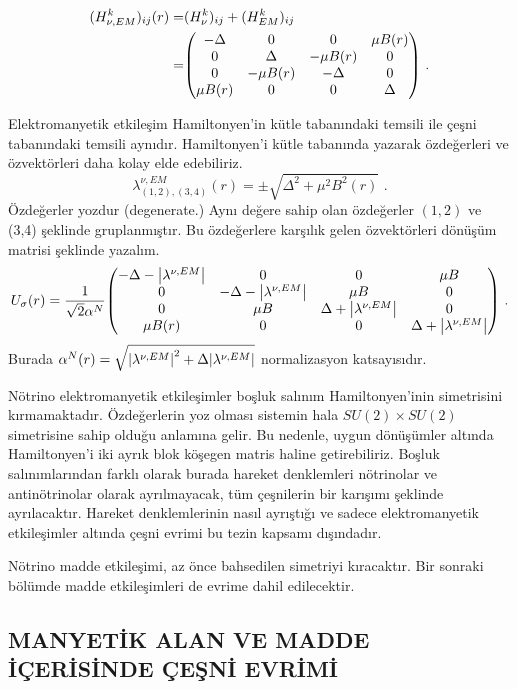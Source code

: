 \begin{align}
	\nonumber (H^{k}_{\nu,EM})_{ij}(r) =& (H^{k}_{\nu})_{ij} + (H^{k}_{EM})_{ij} \\
	=& \mqty(-\Delta&0&0&\mu B(r)\\0&\Delta&-\mu B(r)&0\\0&-\mu B(r)&-\Delta&0\\\mu B(r)&0&0&\Delta) \text{ .}
\end{align}

Elektromanyetik etkileşim Hamiltonyen'in kütle tabanındaki temsili ile çeşni tabanındaki temsili aynıdır. Hamiltonyen'i kütle tabanında yazarak özdeğerleri ve özvektörleri daha kolay elde edebiliriz.
\begin{equation} \label{eqn:eigValNuEm}
	\lambda^{\nu,EM}_{(1,2),(3,4)}(r) = \pm \sqrt{\Delta^{2} + \mu^{2} B^{2}(r)} \text{ .}
\end{equation}
Özdeğerler yozdur (degenerate.) Aynı değere sahip olan özdeğerler $ (1,2) $ ve (3,4) şeklinde gruplanmıştır. Bu özdeğerlere karşılık gelen özvektörleri dönüşüm matrisi şeklinde yazalım.
\begin{equation}
	U_{\sigma}(r) = \frac{1}{\sqrt{2}\alpha^{N}}\mqty(-\Delta-\abs{\lambda^{\nu,EM}} & 0 & 0 & \mu B\\0 &-\Delta-\abs{\lambda^{\nu,EM}} & \mu B & 0\\0 & \mu B & \Delta+\abs{\lambda^{\nu,EM}} & 0\\\mu B(r) & 0 & 0 & \Delta+\abs{\lambda^{\nu,EM}}) \text{ .}
\end{equation}
Burada $ \alpha^{N}(r) = \sqrt{\abs{\lambda^{\nu,EM}}^{2} + \Delta \abs{\lambda^{\nu,EM}}} $ normalizasyon katsayısıdır. 

Nötrino elektromanyetik etkileşimler boşluk salınım Hamiltonyen'inin simetrisini kırmamaktadır. Özdeğerlerin yoz olması sistemin hala $ SU(2) \times SU(2) $ simetrisine sahip olduğu anlamına gelir. Bu nedenle, uygun dönüşümler altında Hamiltonyen'i iki ayrık blok köşegen matris haline getirebiliriz. Boşluk salınımlarından farklı olarak burada hareket denklemleri nötrinolar ve antinötrinolar olarak ayrılmayacak, tüm çeşnilerin bir karışımı şeklinde ayrılacaktır. Hareket denklemlerinin nasıl ayrıştığı ve sadece elektromanyetik etkileşimler altında çeşni evrimi bu tezin kapsamı dışındadır.

Nötrino madde etkileşimi, az önce bahsedilen simetriyi kıracaktır. Bir sonraki bölümde madde etkileşimleri de evrime dahil edilecektir.

\subsection{MANYETİK ALAN VE MADDE İÇERİSİNDE ÇEŞNİ EVRİMİ}\label{sec:EMveMIcerisindeCesniEvri}
